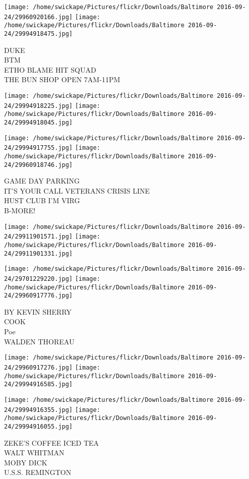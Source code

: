 \documentclass[10pt,letterpaper]{article}
\begin{document}
\texttt{[image: /home/swickape/Pictures/flickr/Downloads/Baltimore 2016-09-24/29960920166.jpg]}
\texttt{[image: /home/swickape/Pictures/flickr/Downloads/Baltimore 2016-09-24/29994918475.jpg]}

DUKE\\
BTM\\
ETHO BLAME HIT SQUAD\\
THE BUN SHOP OPEN 7AM{-}11PM
\pagebreak

\texttt{[image: /home/swickape/Pictures/flickr/Downloads/Baltimore 2016-09-24/29994918225.jpg]}
\texttt{[image: /home/swickape/Pictures/flickr/Downloads/Baltimore 2016-09-24/29994918045.jpg]}

\texttt{[image: /home/swickape/Pictures/flickr/Downloads/Baltimore 2016-09-24/29994917755.jpg]}
\texttt{[image: /home/swickape/Pictures/flickr/Downloads/Baltimore 2016-09-24/29960918746.jpg]}

GAME DAY PARKING\\
IT'S YOUR CALL VETERANS CRISIS LINE\\
HUST CLUB I'M VIRG\\
B{-}MORE!
\pagebreak

\texttt{[image: /home/swickape/Pictures/flickr/Downloads/Baltimore 2016-09-24/29911901571.jpg]}
\texttt{[image: /home/swickape/Pictures/flickr/Downloads/Baltimore 2016-09-24/29911901331.jpg]}

\texttt{[image: /home/swickape/Pictures/flickr/Downloads/Baltimore 2016-09-24/29701229220.jpg]}
\texttt{[image: /home/swickape/Pictures/flickr/Downloads/Baltimore 2016-09-24/29960917776.jpg]}

BY KEVIN SHERRY\\
COOK\\
Poe\\
WALDEN THOREAU
\pagebreak

\texttt{[image: /home/swickape/Pictures/flickr/Downloads/Baltimore 2016-09-24/29960917276.jpg]}
\texttt{[image: /home/swickape/Pictures/flickr/Downloads/Baltimore 2016-09-24/29994916585.jpg]}

\texttt{[image: /home/swickape/Pictures/flickr/Downloads/Baltimore 2016-09-24/29994916355.jpg]}
\texttt{[image: /home/swickape/Pictures/flickr/Downloads/Baltimore 2016-09-24/29994916055.jpg]}

ZEKE'S COFFEE ICED TEA\\
WALT WHITMAN\\
MOBY DICK\\
U.S.S. REMINGTON
\pagebreak
\end{document}

